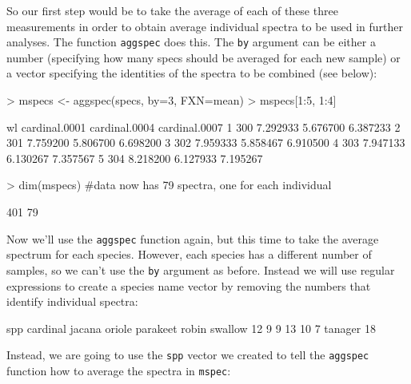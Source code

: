 \documentclass{article}
\newcommand{\code}[1]{{\tt #1}}  %
\begin{document}
\clearpage{}

So our first step would be to take the average of each of these three measurements in order to 
obtain average individual spectra to be used in further analyses. The function \code{aggspec} 
does this. The \code{by} argument can be either a number (specifying how many specs should be 
averaged for each new sample) or a vector specifying the identities of the spectra to be 
combined (see below):

\begin{Schunk}
\begin{Sinput}
> mspecs <- aggspec(specs, by=3, FXN=mean)
> mspecs[1:5, 1:4]
\end{Sinput}
\begin{Soutput}
   wl cardinal.0001 cardinal.0004 cardinal.0007
1 300      7.292933      5.676700      6.387233
2 301      7.759200      5.806700      6.698200
3 302      7.959333      5.858467      6.910500
4 303      7.947133      6.130267      7.357567
5 304      8.218200      6.127933      7.195267
\end{Soutput}
\begin{Sinput}
> dim(mspecs) #data now has 79 spectra, one for each individual
\end{Sinput}
\begin{Soutput}
[1] 401  79
\end{Soutput}
\end{Schunk}

Now we'll use the \code{aggspec} function again, but this time to take the average spectrum for 
each species. However, each species has a different number of samples, so we can't use the 
\code{by} argument as before. Instead we will use regular expressions to create a species name 
vector by removing the numbers that identify individual spectra:

\begin{Schunk}
\begin{Soutput}
spp
cardinal   jacana   oriole parakeet    robin  swallow 
      12        9        9       13       10        7 
 tanager 
      18 
\end{Soutput}
\end{Schunk}

Instead, we are going to use the \code{spp} vector we created to tell the \code{aggspec} 
function how to average the spectra in \code{mspec}:
\end{document}
